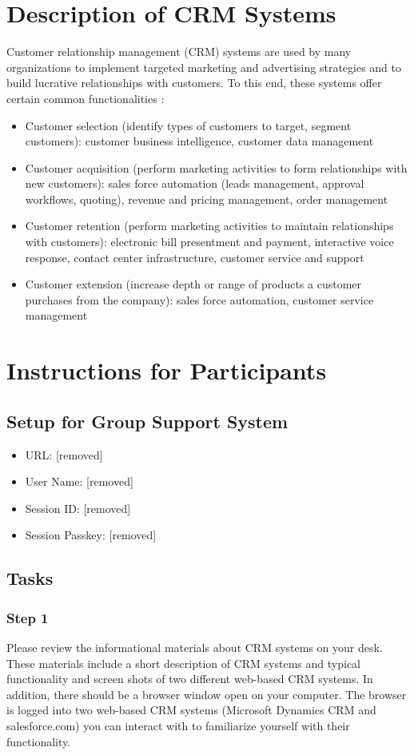 \section{Description of CRM Systems}
Customer relationship management (CRM) systems are used by many organizations to implement targeted marketing and advertising strategies and to build lucrative relationships with customers. To this end, these systems offer certain common functionalities \citep{Chaffey2011,Band2010b}:

\begin{itemize}
	\item Customer selection (identify types of customers to target, segment customers): customer business intelligence, customer data management
	\item Customer acquisition (perform marketing activities to form relationships with new customers): sales force automation (leads management, approval workflows, quoting), revenue and pricing management, order management
	\item Customer retention (perform marketing activities to maintain relationships with customers): electronic bill presentment and payment, interactive voice response, contact center infrastructure, customer service and support
	\item Customer extension (increase depth or range of products a customer purchases from the company): sales force automation, customer service management
\end{itemize}

\section{Instructions for Participants}
\subsection{Setup for Group Support System}
\begin{itemize}
\item URL: [removed]
\item User Name: [removed]
\item Session ID: [removed]
\item Session Passkey: [removed]
\end{itemize}

\subsection{Tasks}
\subsubsection*{Step 1}
Please review the informational materials about CRM systems on your desk. These materials include a short description of CRM systems and typical functionality and screen shots of two different web-based CRM systems. In addition, there should be a browser window open on your computer. The browser is logged into two web-based CRM systems (Microsoft Dynamics CRM and salesforce.com) you can interact with to familiarize yourself with their functionality.

